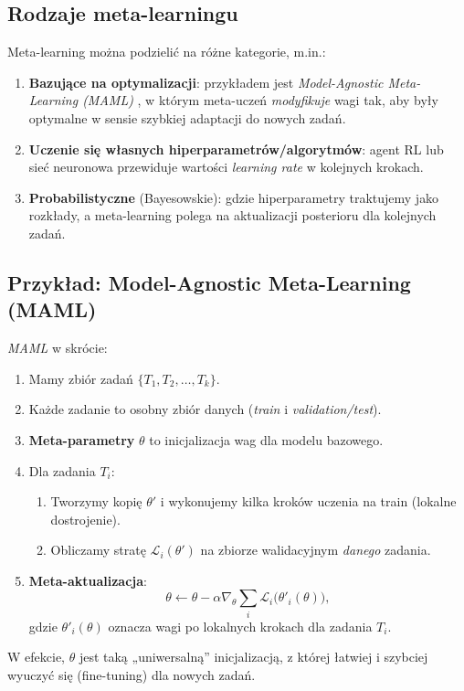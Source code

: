 \documentclass[12pt,a4paper]{article}
\begin{document}
\subsection{Rodzaje meta-learningu}

Meta-learning można podzielić na różne kategorie, m.in.:
\begin{enumerate}
    \item \textbf{Bazujące na optymalizacji}: przykładem jest \emph{Model-Agnostic Meta-Learning (MAML)} \citep{finn2017maml}, w którym meta-uczeń \emph{modyfikuje} wagi tak, aby były optymalne w sensie szybkiej adaptacji do nowych zadań.
    \item \textbf{Uczenie się własnych hiperparametrów/algorytmów}: agent RL lub sieć neuronowa przewiduje wartości \emph{learning rate} w kolejnych krokach.
    \item \textbf{Probabilistyczne} (Bayesowskie): gdzie hiperparametry traktujemy jako rozkłady, a meta-learning polega na aktualizacji posterioru dla kolejnych zadań.
\end{enumerate}

\subsection{Przykład: Model-Agnostic Meta-Learning (MAML)}

\emph{MAML} \citep{finn2017maml} w skrócie:
\begin{enumerate}
    \item Mamy zbiór zadań \(\{ T_1, T_2, \dots, T_k \}\).
    \item Każde zadanie to osobny zbiór danych (\emph{train} i \emph{validation/test}).
    \item \textbf{Meta-parametry} \(\theta\) to inicjalizacja wag dla modelu bazowego.
    \item Dla zadania \(T_i\):
    \begin{enumerate}
        \item Tworzymy kopię \(\theta'\) i wykonujemy kilka kroków uczenia na train (lokalne dostrojenie).
        \item Obliczamy stratę \(\mathcal{L}_i(\theta')\) na zbiorze walidacyjnym \emph{danego} zadania.
    \end{enumerate}
    \item \textbf{Meta-aktualizacja}: 
    \[
        \theta \leftarrow \theta - \alpha \nabla_\theta \sum_i \mathcal{L}_i\bigl(\theta'_i(\theta)\bigr),
    \]
    gdzie \(\theta'_i(\theta)\) oznacza wagi po lokalnych krokach dla zadania \(T_i\).
\end{enumerate}
W efekcie, \(\theta\) jest taką „uniwersalną” inicjalizacją, z której łatwiej i szybciej wyuczyć się (fine-tuning) dla nowych zadań.
\end{document}
